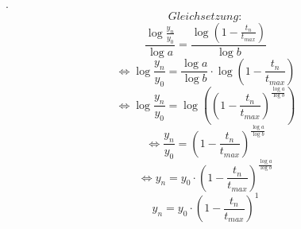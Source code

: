 \documentclass[11pt,a4paper]{article}
\begin{document}
.\\
$$Gleichsetzung:$$
$$\frac{\log\frac{y_n}{y_0}}{\log a}=\frac{\log\left(1-\frac{t_n}{t_{max}}\right)}{\log b}$$
$$\Leftrightarrow\log \frac{y_n}{y_0}=\frac{\log a}{\log b}\cdot\log\left(1-\frac{t_n}{t_{max}}\right)$$
$$\Leftrightarrow\log \frac{y_n}{y_0}=\log\left(\left(1-\frac{t_n}{t_{max}}\right)^{\frac{\log a}{\log b}}\right)$$
$$\Leftrightarrow\frac{y_n}{y_0}=\left(1-\frac{t_n}{t_{max}}\right)^{\frac{\log a}{\log b}}$$
$$\Leftrightarrow y_n=y_0\cdot\left(1-\frac{t_n}{t_{max}}\right)^{\frac{\log a}{\log b}}$$
$$y_n=y_0\cdot\left(1-\frac{t_n}{t_{max}}\right)^1$$
\end{document}
